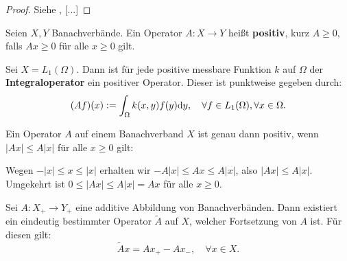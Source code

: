 \begin{proof}
Siehe \cite{werner_2007}, [...]
\end{proof}


 


\begin{defi}
Seien $X, Y$ Banachverbände. Ein Operator $A\colon X\to Y$ heißt \textbf{positiv}, kurz $A\geq0$, falls $Ax\geq0$ für alle $x\geq0 $ gilt.
\end{defi}

\begin{bsp}
Sei $X=L_1(\Omega)$. Dann ist für jede positive messbare Funktion $k$ auf $\Omega$ der \textbf{Integraloperator} ein positiver Operator. Dieser ist punktweise gegeben durch:
\begin{equation*}
(Af)(x):=\int_\Omega k(x,y)f(y)\text dy,\quad\forall f\in L_1(\Omega),\forall x\in \Omega.
\end{equation*}
\end{bsp}




\begin{bem}
Ein Operator $A$ auf einem Banachverband $X$ ist genau dann positiv, wenn $|Ax|\leq A|x|$ für alle $x\geq0$ gilt: 

\par Wegen $-|x|\leq x\leq |x|$ erhalten wir $-A|x|\leq Ax\leq A|x|$, also $|Ax|\leq A|x|$. Umgekehrt ist $0\leq |Ax|\leq A|x|= Ax$ für alle $x\geq0$.
\end{bem}


\begin{fsatz}\label{Fortsetzung positiver Operatoren}
Sei $A\colon X_+\to Y_+$  eine additive Abbildung von Banachverbänden. Dann existiert ein eindeutig bestimmter Operator $\widetilde A$ auf $X$, welcher Fortsetzung von $A$ ist. Für diesen gilt:
\begin{equation*}
\widetilde Ax = Ax_{+} - Ax_{-},\quad\forall x\in X.
\end{equation*}
\end{fsatz}

